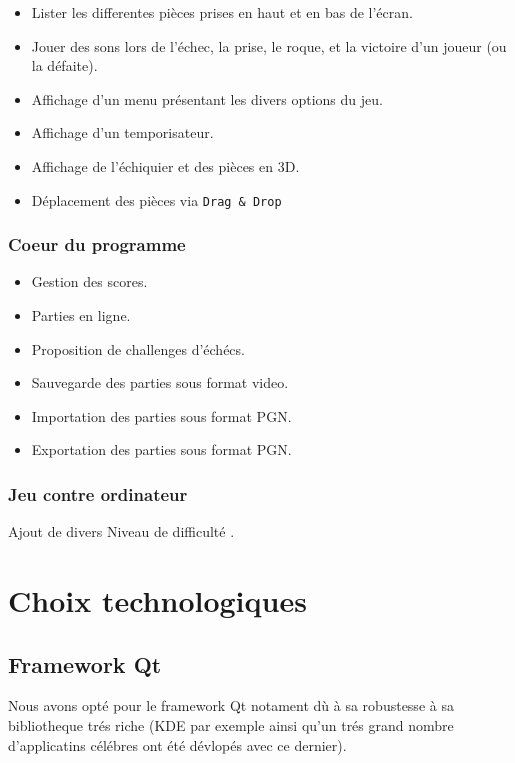 \documentclass{article}
\begin{document}
\begin{itemize}

\item Lister les differentes pièces prises en haut et en bas de l'écran.
\item Jouer des sons lors de l'échec, la prise, le roque, et la victoire d'un joueur (ou la défaite).
\item Affichage d'un menu présentant les divers options du jeu.
\item Affichage d'un temporisateur.
\item Affichage de l'échiquier et des pièces en 3D.
\item Déplacement des pièces via \texttt{Drag \& Drop}

\end{itemize}

\subsubsection{Coeur du programme}

\begin{itemize}

\item Gestion des scores.
\item Parties en ligne.
\item Proposition de challenges d'échécs.
\item Sauvegarde des parties sous format video.
\item Importation des parties sous format PGN.
\item Exportation des parties sous format PGN.

\end{itemize}

\subsubsection{Jeu contre ordinateur}

Ajout de divers Niveau de difficulté .

\section{Choix technologiques}

\subsection{Framework Qt}

Nous avons opté pour le framework Qt \cite{qt} notament dù à sa robustesse à sa bibliotheque trés riche (KDE par exemple ainsi qu'un trés grand nombre d'applicatins célébres ont été dévlopés avec ce dernier).
\end{document}
